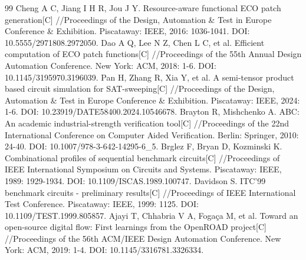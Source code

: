 \documentclass[twocolumn,10pt,fontset=windows]{ctexart}
\begin{document}
\begin{thebibliography}{99}
 Cheng A C, Jiang I H R, Jou J Y. Resource-aware functional ECO patch generation[C] //Proceedings of the Design, Automation \& Test in Europe Conference \& Exhibition. Piscataway: IEEE, 2016: 1036-1041. DOI: 10.5555/2971808.2972050.
 Dao A Q, Lee N Z, Chen L C, et al. Efficient computation of ECO patch functions[C] //Proceedings of the 55th Annual Design Automation Conference. New York: ACM, 2018: 1-6. DOI: 10.1145/3195970.3196039.
 Pan H, Zhang R, Xia Y, et al. A semi-tensor product based circuit simulation for SAT-sweeping[C] //Proceedings of the Design, Automation \& Test in Europe Conference \& Exhibition. Piscataway: IEEE, 2024: 1-6. DOI: 10.23919/DATE58400.2024.10546678.
 Brayton R, Mishchenko A. ABC: An academic industrial-strength verification tool[C] //Proceedings of the 22nd International Conference on Computer Aided Verification. Berlin: Springer, 2010: 24-40. DOI: 10.1007/978-3-642-14295-6\_5.
 Brglez F, Bryan D, Kozminski K. Combinational profiles of sequential benchmark circuits[C] //Proceedings of IEEE International Symposium on Circuits and Systems. Piscataway: IEEE, 1989: 1929-1934. DOI: 10.1109/ISCAS.1989.100747.
 Davidson S. ITC'99 benchmark circuits - preliminary results[C] //Proceedings of IEEE International Test Conference. Piscataway: IEEE, 1999: 1125. DOI: 10.1109/TEST.1999.805857.
 Ajayi T, Chhabria V A, Fogaça M, et al. Toward an open-source digital flow: First learnings from the OpenROAD project[C] //Proceedings of the 56th ACM/IEEE Design Automation Conference. New York: ACM, 2019: 1-4. DOI: 10.1145/3316781.3326334.
\end{thebibliography}
\end{document}
